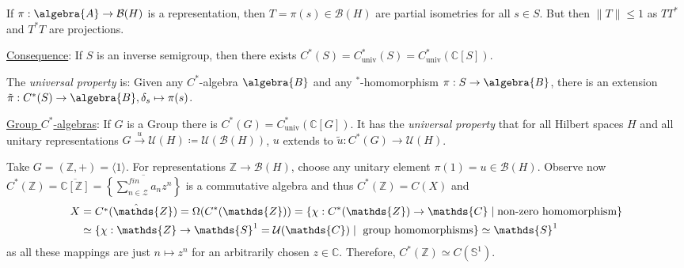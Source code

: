 \documentclass[a4paper]{article}
\begin{document}
\begin{example}
	If $\pi: \algebra{A} \to \mathcal{B}(H)$ is a representation, then $T = \pi(s) \in \mathcal{B}(H)$ are partial isometries for all $s \in S$.
	But then $\|T\| \leq 1$ as $TT^*$ and $T^*T$ are projections.

	\underline{Consequence}: If $S$ is an inverse semigroup, then there exists $C^*(S) = C^*_\mathrm{univ}(S) = C^*_\mathrm{univ}(\mathds{C}[S])$.

	The \textit{universal property} is: Given any $C^*$-algebra $\algebra{B}$ and any $^*$-homomorphism $\pi: S \to \algebra{B}$, there is an extension $\tilde{\pi}: C^*(S) \to \algebra{B}, \delta_s \mapsto \pi(s)$.

	\underline{Group $C^*$-algebras}: If $G$ is a Group there is $C^*(G) = C^*_\mathrm{univ}(\mathds{C}[G])$.
	It has the \textit{universal property} that for all Hilbert spaces $H$ and all unitary representations $G \xrightarrow{u} \mathcal{U}(H) \coloneq \mathcal{U}(\mathcal{B}(H))$, $u$ extends to $\tilde{u}: C^*(G) \to \mathcal{U}(H)$.
\end{example}

\begin{example}
	Take $G = (\mathds{Z}, +) = \langle 1 \rangle$.
	For representations $\mathds{Z} \to \mathcal{B}(H)$, choose any unitary element $\pi(1) = u \in \mathcal{B}(H)$.
	Observe now $C^*(\mathds{Z}) = \overline{\mathds{C}[\mathds{Z}]} = \overline{\left\{ \sum_{n \in \mathscr{Z}}^{fin} a_n z^n \right\}}$ is a commutative algebra and thus $C^*(\mathds{Z}) = C(X)$ and 
	\begin{align*}
		X &= \Hat{C^*(\mathds{Z})} = \Omega(C^*(\mathds{Z})) = \{ \chi: C^*(\mathds{Z}) \to \mathds{C} \mid \text{non-zero homomorphism} \}\\
		&\simeq \{ \chi: \mathds{Z} \to \mathds{S}^1 = \mathcal{U}(\mathds{C}) \mid \text{ group homomorphisms} \} \simeq \mathds{S}^1
	\end{align*}
	as all these mappings are just $n \mapsto z^n$ for an arbitrarily chosen $z \in\mathds{C}$.
	Therefore, $C^*(\mathds{Z}) \simeq C(\mathds{S}^1)$.

	
\end{example}
\end{document}
